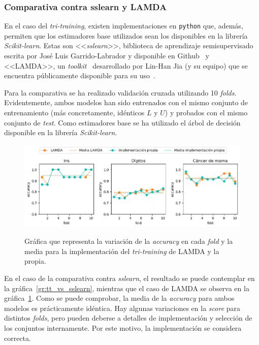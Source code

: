 \subsubsection{Comparativa contra sslearn y LAMDA}

En el caso del \textit{tri-training}, existen implementaciones en \texttt{python} que, además, permiten que los estimadores base utilizados sean los disponibles en la librería \textit{Scikit-learn}. Estas son <<\textit{sslearn}>>, biblioteca de aprendizaje semisupervisado escrita por José Luis Garrido-Labrador y disponible en Github~\cite{sslearnRepo} y <<LAMDA>>, un \textit{toolkit}~\cite{lamdasslPaper} desarrollado por Lin-Han Jia (y su equipo) que se encuentra públicamente disponible para su uso~\cite{lamdasslRepo}.

Para la comparativa se ha realizado validación cruzada utilizando 10 \textit{folds}. Evidentemente, ambos modelos han sido entrenados con el mismo conjunto de entrenamiento (más concretamente, idénticos $L$ y $U$) y probados con el mismo conjunto de \textit{test}. Como estimadores base se ha utilizado el árbol de decisión disponible en la librería \textit{Scikit-learn}.

\begin{figure}[h]
	\caption[\textit{Tri-training}: comparativa contra LAMDA]{Gráfica que representa la variación de la \textit{accuracy} en cada \textit{fold} y la media para la implementación del \textit{tri-training} de LAMDA y la propia.}
	\centering
	\includegraphics[scale=0.62]{../img/memoria/5_tritraining_lamda}
	\label{gr:tt_vs_lamda}
\end{figure}

En el caso de la comparativa contra \textit{sslearn}, el resultado se puede contemplar en la gráfica~\ref{gr:tt_vs_sslearn}, mientras que el caso de LAMDA se observa en la gráfica~\ref{gr:tt_vs_lamda}. Como se puede comprobar, la media de la \textit{accuracy} para ambos modelos es prácticamente idéntica. Hay algunas variaciones en la \textit{score} para distintos \textit{folds}, pero pueden deberse a detalles de implementación y selección de los conjuntos internamente. Por este motivo, la implementación se considera correcta.

